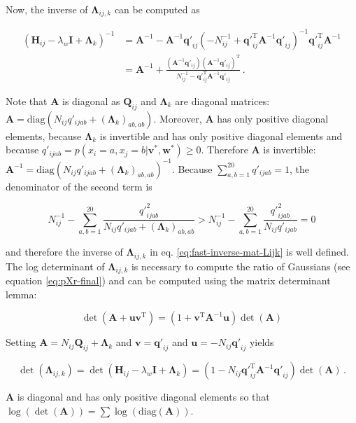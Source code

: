 \documentclass[11pt,a4paper,twoside]{book}
\newcommand{\eq}{\!=\!}
\renewcommand{\H}{\mathbf{H}}
\newcommand{\I}{\mathbf{I}}
\newcommand{\Lijk}{\mathbf{\Lambda}_{ij,k}}
\newcommand{\Lk}{\mathbf{\Lambda}_k}
\newcommand{\Qij}{\mathbf{Q}_{ij}}
\newcommand{\qij}{\mathbf{q\prime}_{ij}}
\renewcommand{\v}{\mathbf{v}}
\newcommand{\w}{\mathbf{w}}
\theoremstyle{definition}
\theoremstyle{definition}
\theoremstyle{remark}
\begin{document}
Now, the inverse of \(\Lijk\) can be computed as

\begin{align}
      \left( \H_{ij} - \lambda_w \I + \Lk \right)^{-1} & = \mathbf{A}^{-1} - \mathbf{A}^{-1} \qij  \left( -N_{ij}^{-1}  + \qij^\mathrm{T} \mathbf{A}^{-1} \qij \right)^{-1}  \qij^\mathrm{T} \mathbf{A}^{-1} \nonumber\\
     & = \mathbf{A}^{-1} + \frac{ (\mathbf{A}^{-1} \qij) (\mathbf{A}^{-1} \qij)^{\mathrm{T}} }{ N_{ij}^{-1} - \qij^\mathrm{T} \mathbf{A}^{-1} \qij} \,.
\label{eq:fast-inverse-mat-Lijk}
\end{align}

Note that \(\mathbf{A}\) is diagonal as \(\Qij\) and \(\Lk\) are
diagonal matrices:
\(\mathbf{A} = \text{diag}(N_{ij} q'_{ijab} + (\Lk)_{ab,ab})\).
Moreover, \(\mathbf{A}\) has only positive diagonal elements, because
\(\Lk\) is invertible and has only positive diagonal elements and
because \(q'_{ijab} = p(x_i \eq a, x_j \eq b | \v^*,\w^*) \ge 0\).
Therefore \(\mathbf{A}\) is invertible:
\(\mathbf{A}^{-1} = \text{diag}(N_{ij} q'_{ijab} + (\Lk)_{ab,ab} )^{-1}\).
Because \(\sum_{a,b=1}^{20} q'_{ijab} = 1\), the denominator of the
second term is

\begin{equation}
    N_{ij}^{-1} - \sum_{a,b=1}^{20}  \frac{{q'}_{ijab}^2}{N_{ij} q'_{ijab} + {(\Lk)}_{ab,ab} } > N_{ij}^{-1} - \sum_{a,b=1}^{20} \frac{{q'}^2_{ijab}}{N_{ij} q'_{ijab}} = 0
\end{equation}

and therefore the inverse of \(\Lijk\) in eq.
\eqref{eq:fast-inverse-mat-Lijk} is well defined. The log determinant of
\(\Lijk\) is necessary to compute the ratio of Gaussians (see equation
\eqref{eq:pXr-final}) and can be computed using the matrix determinant
lemma:

\begin{equation}
  \det(\mathbf{A} + \mathbf{uv}^\mathrm{T}) = (1+\mathbf{v}^\mathrm{T} \mathbf{A}^{-1} \mathbf{u}) \det(\mathbf{A})
\end{equation}

Setting \(\mathbf{A} = N_{ij} \Qij + \Lk\) and \(\v = \qij\) and
\(\mathbf{u} = - N_{ij} \qij\) yields

\begin{equation}
  \det(\Lijk ) = \det(\H_{ij} - \lambda_w \I + \Lk) = (1 - N_{ij}\qij^\mathrm{T} \mathbf{A}^{-1}\qij) \det(\mathbf{A}) \,.
\end{equation}

\(\mathbf{A}\) is diagonal and has only positive diagonal elements so
that
\(\log(\det(\mathbf{A})) = \sum \log \left( \text{diag}(\mathbf{A}) \right)\).
\end{document}
